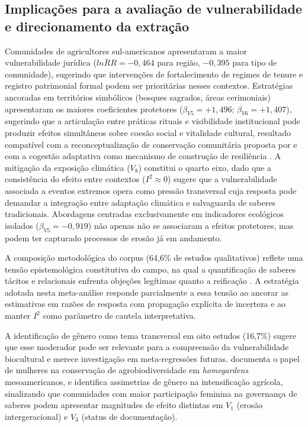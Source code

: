 \documentclass[12pt,a4paper]{article}
\begin{document}
\subsection{Implicações para a avaliação de vulnerabilidade e direcionamento da extração}
\label{sec:vulnerability-implications}

Comunidades de agricultores sul-americanos apresentaram a maior vulnerabilidade jurídica ($\overline{lnRR} = -0{,}464$ para região, $-0{,}395$ para tipo de comunidade), sugerindo que intervenções de fortalecimento de regimes de tenure e registro patrimonial formal podem ser prioritárias nesses contextos. Estratégias ancoradas em territórios simbólicos (bosques sagrados, áreas cerimoniais) apresentaram os maiores coeficientes protetores ($\beta_{V5} = +1{,}496$; $\beta_{V6} = +1{,}407$), sugerindo que a articulação entre práticas rituais e visibilidade institucional pode produzir efeitos simultâneos sobre coesão social e vitalidade cultural, resultado compatível com a reconceptualização de conservação comunitária proposta por \citet{Berkes2004} e com a cogestão adaptativa como mecanismo de construção de resiliência \citep{OlssonFolkeBerkes2004}. A mitigação da exposição climática ($V_8$) constitui o quarto eixo, dado que a consistência do efeito entre contextos ($I^2 \approx 0$) sugere que a vulnerabilidade associada a eventos extremos opera como pressão transversal cuja resposta pode demandar a integração entre adaptação climática e salvaguarda de saberes tradicionais. Abordagens centradas exclusivamente em indicadores ecológicos isolados ($\beta_{V5} = -0{,}919$) não apenas não se associaram a efeitos protetores, mas podem ter capturado processos de erosão já em andamento.

A composição metodológica do corpus (64,6\% de estudos qualitativos) reflete uma tensão epistemológica constitutiva do campo, na qual a quantificação de saberes tácitos e relacionais enfrenta objeções legítimas quanto a reificação \citep{Agrawal2002,GomezBaggethun2013}. A estratégia adotada nesta meta-análise responde parcialmente a essa tensão ao ancorar as estimativas em razões de resposta com propagação explícita de incerteza e ao manter $I^2$ como parâmetro de cautela interpretativa.

A identificação de gênero como tema transversal em oito estudos (16,7\%) sugere que esse moderador pode ser relevante para a compreensão da vulnerabilidade biocultural e merece investigação em meta-regressões futuras. \citet{RomeroSilva2026} documenta o papel de mulheres na conservação de agrobiodiversidade em \textit{homegardens} mesoamericanos, e \citet{MugiNgenga2016} identifica assimetrias de gênero na intensificação agrícola, sinalizando que comunidades com maior participação feminina na governança de saberes podem apresentar magnitudes de efeito distintas em $V_1$ (erosão intergeracional) e $V_3$ (status de documentação).
\end{document}
